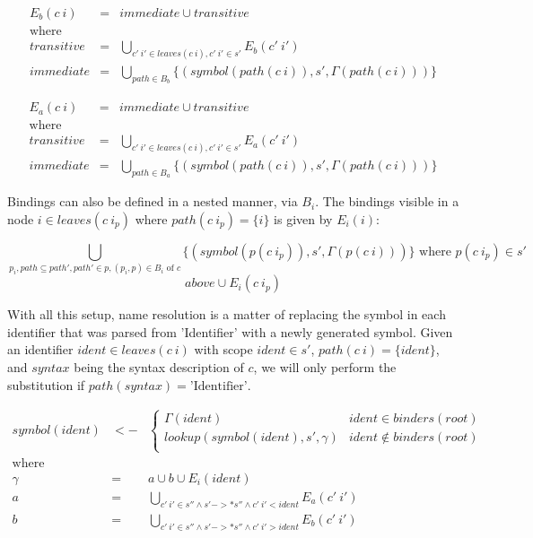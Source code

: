 \documentclass{kththesis}
\begin{document}
$$
\begin{array}{rcl}
E_b(c~i) & = & immediate \cup transitive \\
\text{where} & & \\
transitive & = & \bigcup_{c'~i' \in leaves(c~i), c'~i' \in s'} E_b(c'~i') \\
immediate & = & \bigcup_{path \in B_b} \{(symbol(path(c~i)), s', \Gamma(path(c~i)))\}
\end{array}
$$

$$
\begin{array}{rcl}
E_a(c~i) & = & immediate \cup transitive \\
\text{where} & & \\
transitive & = & \bigcup_{c'~i' \in leaves(c~i), c'~i' \in s'} E_a(c'~i') \\
immediate & = & \bigcup_{path \in B_a} \{(symbol(path(c~i)), s', \Gamma(path(c~i)))\}
\end{array}
$$

Bindings can also be defined in a nested manner, via $B_i$. The bindings visible in a node $i \in leaves(c~i_p)$ where $path(c~i_p) = \{i\}$ is given by $E_i(i)$:


$$
\bigcup_{p_i, path \subseteq path', path' \in p, (p_i, p) \in B_i \text{ of } c} \{(symbol(p(c~i_p)), s', \Gamma(p(c~i)))\} \text{ where } p(c~i_p) \in s'
$$
$$
above \cup E_i(c~i_p)
$$

With all this setup, name resolution is a matter of replacing the symbol in each identifier that was parsed from 'Identifier' with a newly generated symbol. Given an identifier $ident \in leaves(c~i)$ with scope $ident \in s'$, $path(c~i) = \{ident\}$, and $syntax$ being the syntax description of $c$, we will only perform the substitution if $path(syntax) = \text{'Identifier'}$.

$$
\begin{array}{rcl}
symbol(ident) & <- &
\begin{cases}
\Gamma(ident) & ident \in binders(root) \\
lookup(symbol(ident), s', \gamma) & ident \not\in binders(root) \\
\end{cases} \\
\text{where} & & \\
\gamma & = & a \cup b \cup E_i(ident) \\
a & = & \bigcup_{c'~i' \in s'' \land s' ->* s'' \land c'~i' < ident} E_a(c'~i') \\
b & = & \bigcup_{c'~i' \in s'' \land s' ->* s'' \land c'~i' > ident} E_b(c'~i') \\
\end{array}
$$
\end{document}
